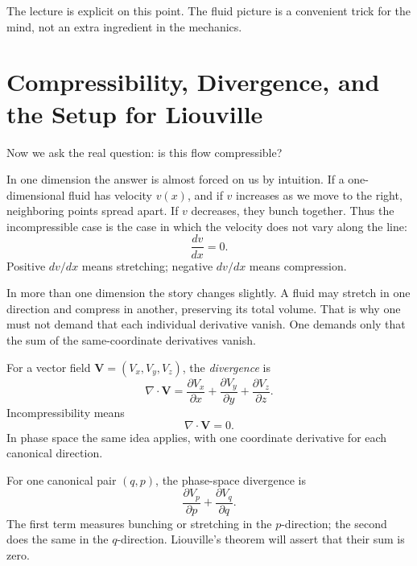 The lecture is explicit on this point. The fluid picture is a convenient trick for the mind, not an extra ingredient in the mechanics.

\section{Compressibility, Divergence, and the Setup for Liouville}

Now we ask the real question: is this flow compressible?

In one dimension the answer is almost forced on us by intuition. If a one-dimensional fluid has velocity \(v(x)\), and if \(v\) increases as we move to the right, neighboring points spread apart. If \(v\) decreases, they bunch together. Thus the incompressible case is the case in which the velocity does not vary along the line:
\begin{equation}
\frac{dv}{dx}=0.
\end{equation}
Positive \(dv/dx\) means stretching; negative \(dv/dx\) means compression.

In more than one dimension the story changes slightly. A fluid may stretch in one direction and compress in another, preserving its total volume. That is why one must not demand that each individual derivative vanish. One demands only that the sum of the same-coordinate derivatives vanish.

\begin{definition}
For a vector field \(\mathbf V=(V_x,V_y,V_z)\), the \emph{divergence} is
\begin{equation}
\nabla\cdot \mathbf V
=
\frac{\partial V_x}{\partial x}
+
\frac{\partial V_y}{\partial y}
+
\frac{\partial V_z}{\partial z}.
\end{equation}
Incompressibility means
\begin{equation}
\nabla\cdot \mathbf V=0.
\end{equation}
In phase space the same idea applies, with one coordinate derivative for each canonical direction.
\end{definition}

For one canonical pair \((q,p)\), the phase-space divergence is
\begin{equation}
\frac{\partial V_p}{\partial p}+\frac{\partial V_q}{\partial q}.
\end{equation}
The first term measures bunching or stretching in the \(p\)-direction; the second does the same in the \(q\)-direction. Liouville's theorem will assert that their sum is zero.


